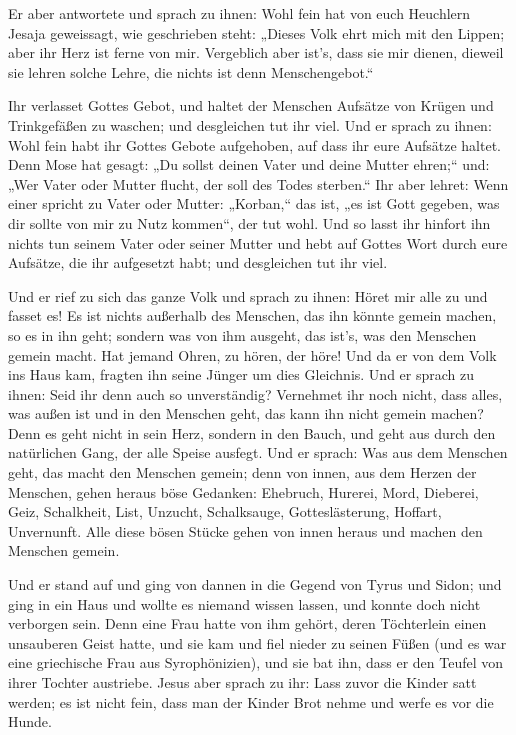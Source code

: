  Er aber antwortete und sprach zu ihnen: Wohl fein hat von
euch Heuchlern Jesaja geweissagt, wie geschrieben steht: „Dieses Volk
ehrt mich mit den Lippen; aber ihr Herz ist ferne von mir.
 Vergeblich aber ist's, dass sie mir dienen, dieweil sie
lehren solche Lehre, die nichts ist denn Menschengebot.``

 Ihr verlasset Gottes Gebot, und haltet der Menschen
Aufsätze von Krügen und Trinkgefäßen zu waschen; und desgleichen tut ihr
viel.  Und er sprach zu ihnen: Wohl fein habt ihr Gottes
Gebote aufgehoben, auf dass ihr eure Aufsätze haltet. 
Denn Mose hat gesagt: „Du sollst deinen Vater und deine Mutter ehren;``
und: „Wer Vater oder Mutter flucht, der soll des Todes sterben.``
 Ihr aber lehret: Wenn einer spricht zu Vater oder
Mutter: „Korban,`` das ist, „es ist Gott gegeben, was dir sollte von mir
zu Nutz kommen``, der tut wohl.  Und so lasst ihr hinfort
ihn nichts tun seinem Vater oder seiner Mutter  und hebt
auf Gottes Wort durch eure Aufsätze, die ihr aufgesetzt habt; und
desgleichen tut ihr viel.

 Und er rief zu sich das ganze Volk und sprach zu ihnen:
Höret mir alle zu und fasset es!  Es ist nichts außerhalb
des Menschen, das ihn könnte gemein machen, so es in ihn geht; sondern
was von ihm ausgeht, das ist's, was den Menschen gemein macht.
 Hat jemand Ohren, zu hören, der höre! 
Und da er von dem Volk ins Haus kam, fragten ihn seine Jünger um dies
Gleichnis.  Und er sprach zu ihnen: Seid ihr denn auch so
unverständig? Vernehmet ihr noch nicht, dass alles, was außen ist und in
den Menschen geht, das kann ihn nicht gemein machen? 
Denn es geht nicht in sein Herz, sondern in den Bauch, und geht aus
durch den natürlichen Gang, der alle Speise ausfegt.  Und
er sprach: Was aus dem Menschen geht, das macht den Menschen gemein;
 denn von innen, aus dem Herzen der Menschen, gehen
heraus böse Gedanken: Ehebruch, Hurerei, Mord,  Dieberei,
Geiz, Schalkheit, List, Unzucht, Schalksauge, Gotteslästerung, Hoffart,
Unvernunft.  Alle diese bösen Stücke gehen von innen
heraus und machen den Menschen gemein.

 Und er stand auf und ging von dannen in die Gegend von
Tyrus und Sidon; und ging in ein Haus und wollte es niemand wissen
lassen, und konnte doch nicht verborgen sein.  Denn eine
Frau hatte von ihm gehört, deren Töchterlein einen unsauberen Geist
hatte, und sie kam und fiel nieder zu seinen Füßen  (und
es war eine griechische Frau aus Syrophönizien), und sie bat ihn, dass
er den Teufel von ihrer Tochter austriebe.  Jesus aber
sprach zu ihr: Lass zuvor die Kinder satt werden; es ist nicht fein,
dass man der Kinder Brot nehme und werfe es vor die Hunde.

